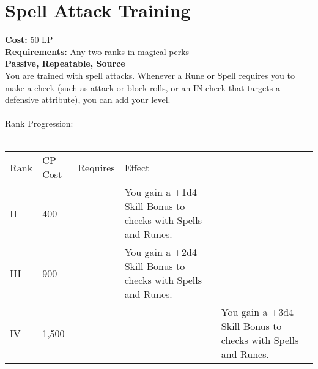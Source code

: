 \section{Spell Attack Training}\label{perk:spellAttackTraining}
\textbf{Cost:} 50 LP\\
\textbf{Requirements:} Any two ranks in magical perks\\
\textbf{Passive, Repeatable, Source}\\
You are trained with spell attacks.
Whenever a Rune or Spell requires you to make a check (such as attack or block rolls, or an IN check that targets a defensive attribute), you can add your level.\\
\\
Rank Progression:\\
\\
\begin{longtable}{l | l | l | l | p{9cm}}
	Rank & CP Cost & Requires & Effect\\
	II & 400 & - & You gain a +1d4 Skill Bonus to checks with Spells and Runes.\\
	III & 900 & - & You gain a +2d4 Skill Bonus to checks with Spells and Runes.\\
	IV & 1,500 && - & You gain a +3d4 Skill Bonus to checks with Spells and Runes.\\
\end{longtable}